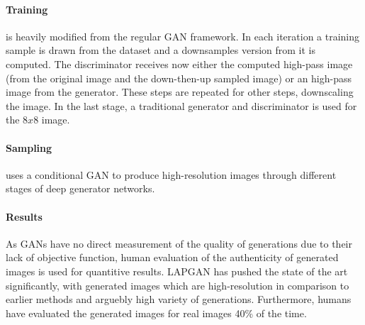 \paragraph{Training} is heavily modified from the regular GAN framework.
In each iteration a training sample is drawn from the dataset and a downsamples version from it is computed.
The discriminator receives now either the computed high-pass image (from the original image and the down-then-up sampled image) or an high-pass image from the generator.
These steps are repeated for other steps, downscaling the image.
In the last stage, a traditional generator and discriminator is used for the $8x8$ image.
\paragraph{Sampling} uses a conditional GAN to produce high-resolution images through different stages of deep generator networks.

\paragraph{Results}
As GANs have no direct measurement of the quality of generations due to their lack of objective function, human evaluation of the authenticity of generated images is used for quantitive results.
LAPGAN has pushed the state of the art significantly, with generated images which are high-resolution in comparison to earlier methods and arguebly high variety of generations.
Furthermore, humans have evaluated the generated images for real images 40\% of the time.


